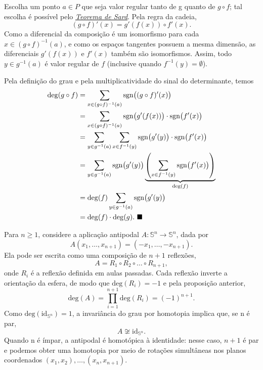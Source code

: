 \documentclass[../differential_topology.tex]{subfiles}
\begin{document}
\begin{proof*}
	Escolha um ponto \(a\in P\) que seja valor regular tanto de g quanto de \(g\circ f\); tal escolha é possível pelo \hyperlink{sard_theorem}{\textit{Teorema de Sard}}. Pela regra da cadeia,
	\[
		(g\circ f)'(x) = g'(f(x))\circ f'(x).
	\]
	Como a diferencial da composição é um isomorfismo para cada \(x\in (g\circ f)^{-1}(a)\), e como os espaços tangentes possuem a mesma dimensão, as diferenciais \(g'(f(x))\) e \(f'(x)\) também são isomorfismos. Assim, todo \(y\in g^{-1}(a)\) é valor regular de \(f\) (inclusive quando \(f^{-1}(y)=\emptyset\)).

	Pela definição do grau e pela multiplicatividade do sinal do determinante, temos
	\begin{align*}
		\mathrm{deg}(g\circ f)
		 & = \sum\limits_{x\in (g\circ f)^{-1}(a)}\mathrm{sgn}\bigl((g\circ f)'(x)\bigr)                                                                                    \\
		 & = \sum\limits_{x\in (g\circ f)^{-1}(a)}\mathrm{sgn}\bigl(g'(f(x))\bigr)\cdot\mathrm{sgn}\bigl(f'(x)\bigr)                                                        \\
		 & = \sum\limits_{y\in g^{-1}(a)}\sum\limits_{x\in f^{-1}(y)}\mathrm{sgn}\bigl(g'(y)\bigr)\cdot\mathrm{sgn}\bigl(f'(x)\bigr)                                        \\
		 & = \sum\limits_{y\in g^{-1}(a)}\mathrm{sgn}\bigl(g'(y)\bigr)\underbrace{\left(\sum\limits_{x\in f^{-1}(y)}\mathrm{sgn}\bigl(f'(x)\bigr)\right)}_{\mathrm{deg}(f)} \\
		 & = \mathrm{deg}(f)\sum\limits_{y\in g^{-1}(a)}\mathrm{sgn}\bigl(g'(y)\bigr)                                                                                       \\
		 & = \mathrm{deg}(f)\cdot\mathrm{deg}(g). \text{ $\blacksquare$}
	\end{align*}
\end{proof*}

\begin{example}
	Para \(n\geq 1\), considere a aplicação antipodal \(A:\mathbb{S}^{n}\rightarrow\mathbb{S}^{n}\), dada por
	\[
		A(x_1,\dotsc,x_{n+1})=(-x_1,\dotsc,-x_{n+1}).
	\]
	Ela pode ser escrita como uma composição de \(n+1\) reflexões,
	\[
		A=R_1\circ R_2\circ\dotsc\circ R_{n+1},
	\]
	onde \(R_i\) é a reflexão definida em aulas passadas. Cada reflexão inverte a orientação da esfera, de modo que \(\mathrm{deg}(R_i)=-1\) e pela proposição anterior,
	\[
		\mathrm{deg}(A)=\prod\limits_{i=1}^{n+1}\mathrm{deg}(R_i)=(-1)^{n+1}.
	\]
	Como \(\mathrm{deg}(\mathrm{id}_{\mathbb{S}^{n}})=1\), a invariância do grau por homotopia implica que, se n é par,
	\[
		A\not\cong\mathrm{id}_{\mathbb{S}^{n}}.
	\]
	Quando n é ímpar, a antipodal é homotópica à identidade: nesse caso, \(n+1\) é par e podemos obter uma homotopia por meio de rotações simultâneas nos planos coordenados \((x_1,x_2),\dotsc,(x_n,x_{n+1})\).
\end{example}
\end{document}

